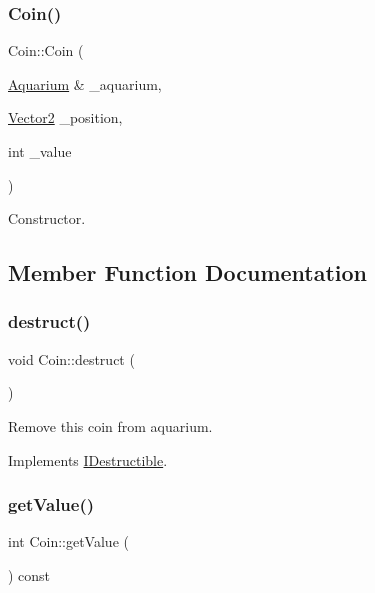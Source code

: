 \subsubsection{\texorpdfstring{Coin()}{Coin()}}
{\footnotesize\ttfamily Coin\+::\+Coin (\begin{DoxyParamCaption}\item[{\mbox{\hyperlink{class_aquarium}{Aquarium}} \&}]{\+\_\+aquarium,  }\item[{\mbox{\hyperlink{struct_vector2}{Vector2}}}]{\+\_\+position,  }\item[{int}]{\+\_\+value }\end{DoxyParamCaption})}



Constructor. 



\subsection{Member Function Documentation}
\mbox{\label{class_coin_a16c42ef0d21f50bb08d4099d82b4ed57}} 
\subsubsection{\texorpdfstring{destruct()}{destruct()}}
{\footnotesize\ttfamily void Coin\+::destruct (\begin{DoxyParamCaption}{ }\end{DoxyParamCaption})\hspace{0.3cm}{\ttfamily [virtual]}}



Remove this coin from aquarium. 



Implements \mbox{\hyperlink{class_i_destructible_a63016d1bb4daa0a726fc8add9a0be62d}{I\+Destructible}}.

\mbox{\label{class_coin_a53c8bf65afdde1422cfda51d753d74b7}} 
\subsubsection{\texorpdfstring{get\+Value()}{getValue()}}
{\footnotesize\ttfamily int Coin\+::get\+Value (\begin{DoxyParamCaption}{ }\end{DoxyParamCaption}) const}



